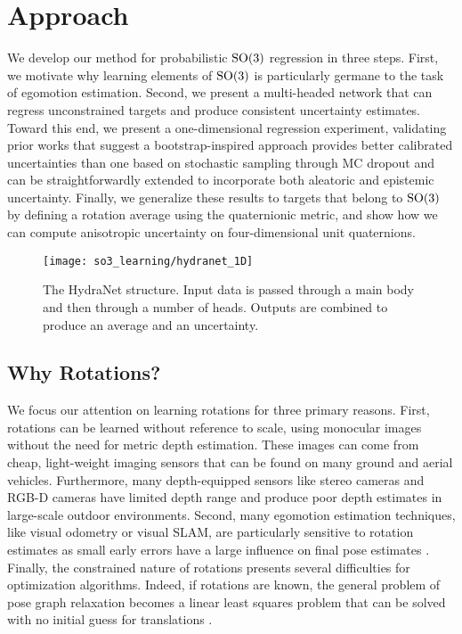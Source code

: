\section{Approach}

We develop our method for probabilistic $\mathrm{SO}(3)$ regression in three steps. 
First, we motivate why learning elements of $\mathrm{SO}(3)$ is particularly germane to the task of egomotion estimation. Second, we present a multi-headed network that can regress unconstrained targets and produce consistent uncertainty estimates. Toward this end, we present a one-dimensional regression experiment, validating prior works \citep{Lakshminarayanan2017,Osband2016} that suggest a bootstrap-inspired approach provides better calibrated uncertainties than one based on stochastic sampling through MC dropout and can be straightforwardly extended to incorporate both aleatoric and epistemic uncertainty. Finally, we generalize these results to targets that belong to $\mathrm{SO}(3)$ by defining a rotation average using the quaternionic metric, and show how we can compute anisotropic uncertainty on four-dimensional unit quaternions.

\begin{figure}
	\centering
	\texttt{[image: so3\_learning/hydranet\_1D]}
	\caption{The HydraNet structure. Input data is passed through a main body and then through a number of heads. Outputs are combined to produce an average and an uncertainty.}
	\label{fig:hydranet_1D}
\end{figure}

\subsection{Why Rotations?}
We focus our attention on learning rotations for three primary reasons. 
First, rotations can be learned without reference to scale, using monocular images without the need for metric depth estimation. These images can come from cheap, light-weight imaging sensors that can be found on many ground and aerial vehicles. Furthermore, many depth-equipped sensors like stereo cameras and RGB-D cameras have limited depth range and produce poor depth estimates in large-scale outdoor environments.  Second, many egomotion estimation techniques, like visual odometry or visual SLAM, are particularly sensitive to rotation estimates as small early errors have a large influence on final pose estimates \citep{Olson2003-ax}. Finally, the constrained nature of rotations presents several difficulties for optimization algorithms. Indeed, if rotations are known, the general problem of pose graph relaxation becomes a linear least squares problem that can be solved with no initial guess for translations \citep{Carlone2015-ud}. 

